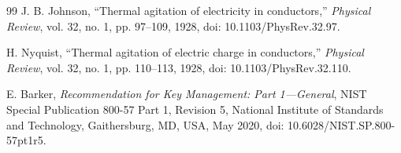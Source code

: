 \documentclass[conference,a4paper]{IEEEtran}
\begin{document}
\begin{thebibliography}{99}
J. B. Johnson, ``Thermal agitation of electricity in conductors,'' 
\emph{Physical Review}, vol. 32, no. 1, pp. 97--109, 1928,
doi: 10.1103/PhysRev.32.97.

H. Nyquist, ``Thermal agitation of electric charge in conductors,'' 
\emph{Physical Review}, vol. 32, no. 1, pp. 110--113, 1928,
doi: 10.1103/PhysRev.32.110.


E. Barker, \emph{Recommendation for Key Management: Part 1---General},
NIST Special Publication 800-57 Part 1, Revision 5,
National Institute of Standards and Technology,
Gaithersburg, MD, USA, May 2020,
doi: 10.6028/NIST.SP.800-57pt1r5.

\end{thebibliography}
\end{document}
